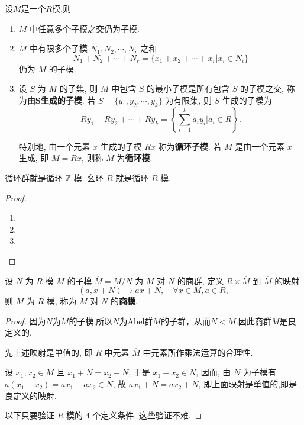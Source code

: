 \documentclass[../../main.tex]{subfiles}%
\begin{document}
\begin{theorem}
设$M$是一个$R$模,则
\begin{enumerate}[(1)]
\item \( M \) 中任意多个子模之交仍为子模.

\item \( M \) 中有限多个子模 \( N_1, N_2, \cdots, N_r \) 之和
\[
N_1 + N_2 + \cdots + N_r = \{x_1 + x_2 + \cdots + x_r | x_i \in N_i\}
\]
仍为 \( M \) 的子模.

\item 设 \( S \) 为 \( M \) 的子集, 则 \( M \) 中包含 \( S \) 的最小子模是所有包含 \( S \) 的子模之交, 称为\textbf{由\(\boldsymbol{S}\)生成的子模}. 若 \( S = \{y_1, y_2, \cdots, y_k\} \) 为有限集, 则 \( S \) 生成的子模为
\[
Ry_1 + Ry_2 + \cdots + Ry_k = \left\{ \sum_{i=1}^k a_i y_i \bigg| a_i \in R \right\}.
\]

特别地, 由一个元素 \( x \) 生成的子模 \( Rx \) 称为\textbf{循环子模}. 若 \( M \) 是由一个元素 \( x \) 生成, 即 \( M = Rx \), 则称 \( M \) 为\textbf{循环模}.
\end{enumerate}
\end{theorem}
\begin{remark}
循环群就是循环 \( \mathbb{Z} \) 模. 幺环 \( R \) 就是循环 \( R \) 模.
\end{remark}
\begin{proof}
\begin{enumerate}[(1)]
\item 

\item 

\item 
\end{enumerate}

\end{proof}

\begin{theorem}
设 \( N \) 为 \( R \) 模 \( M \) 的子模.\( \overline{M} = M/N \) 为 \( M \) 对 \( N \) 的商群, 定义 \( R \times \overline{M} \) 到 \( \overline{M} \) 的映射
\[
(a, x + N) \to ax + N, \quad \forall x \in M, a \in R,
\]
则 \( \overline{M} \) 为 \( R \) 模, 称为 \( M \) 对 \( N \) 的\textbf{商模}.
\end{theorem}
\begin{proof}

因为$N$为$M$的子模,所以$N$为Abel群$M$的子群，从而$N\lhd M$.因此商群$\overline{M}$是良定义的.

先上述映射是单值的, 即 \( R \) 中元素 \( \overline{M} \) 中元素所作乘法运算的合理性.

设 \( x_1, x_2 \in M \) 且 \( x_1 + N = x_2 + N \), 于是 \( x_1 - x_2 \in N \), 因而, 由 \( N \) 为子模有 \( a(x_1 - x_2) = ax_1 - ax_2 \in N \), 故 \( ax_1 + N = ax_2 + N \), 即上面映射是单值的,即是良定义的映射.

以下只要验证 \( R \) 模的 4 个定义条件. 这些验证不难.

\end{proof}
\end{document}

